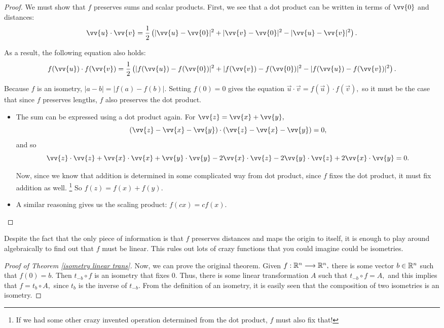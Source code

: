 \begin{proof}

We must show that $f$ preserves sums and scalar products. First, we see that a dot product can be written in terms of $\vv{0}$ and distances:
    \[
    \vv{u} \cdot \vv{v} = \frac{1}{2}\left(|\vv{u} - \vv{0}|^2 + |\vv{v} - \vv{0}|^2 - |\vv{u}-\vv{v}|^2\right).
    \]
    
As a result, the following equation also holds:
    \[
    f(\vv{u}) \cdot f(\vv{v}) = \frac{1}{2}\left(|f(\vv{u}) - f(\vv{0})|^2 + |f(\vv{v}) - f(\vv{0})|^2 - |f(\vv{u})-f(\vv{v})|^2\right).
    \]
    
    Because $f$ is an isometry, $|a-b| = |f(a)-f(b)|$. Setting $f(0) = 0$ gives the equation $\vec{u} \cdot \vec{v} = f(\vec{u}) \cdot f(\vec{v}),$ so it must be the case that since $f$ preserves lengths, $f$ also preserves the dot product.
\begin{itemize}
    \item The sum can be expressed using a dot product again. For $\vv{z} = \vv{x} + \vv{y},$ 
    \[
    (\vv{z} - \vv{x}-\vv{y}) \cdot (\vv{z} - \vv{x}-\vv{y}) = 0,
    \]
    and so 
    \[
    \vv{z} \cdot \vv{z} + \vv{x} \cdot \vv{x} + \vv{y}\cdot\vv{y} - 2\vv{x}\cdot\vv{z} - 2\vv{y}\cdot \vv{z} + 2\vv{x}\cdot\vv{y} = 0.
    \]
    
    Now, since we know that addition is determined in some complicated way from dot product, since $f$ fixes the dot product, it must fix addition as well. \footnote{If we had some other crazy invented operation determined from the dot product, $f$ must also fix that!}
    So $f(z) = f(x) + f(y).$
    
    \item A similar reasoning gives us the scaling product: $f(cx) = cf(x).$
\end{itemize}

\end{proof}

Despite the fact that the only piece of information is that $f$ preserves distances and maps the origin to itself, it is enough to play around algebraically to find out that $f$ must be linear. This rules out lots of crazy functions that you could imagine could be isometries. 

\begin{proof}[Proof of Theorem \ref{isometry linear trans}]


Now, we can prove the original theorem. Given $f: \mathbb R^n \longrightarrow \mathbb R^n,$ there is some vector $b \in \mathbb R^n$ such that $f(0) = b.$ Then $t_{-b} \circ f$ is an isometry that fixes $0.$ Thus, there is some linear transformation $A$ such that $t_{-b} \circ f = A,$ and this implies that $f = t_{b} \circ A,$ since $t_{b}$ is the inverse of $t_{-b}.$ From the definition of an isometry, it is easily seen that the composition of two isometries is an isometry.

\end{proof}

